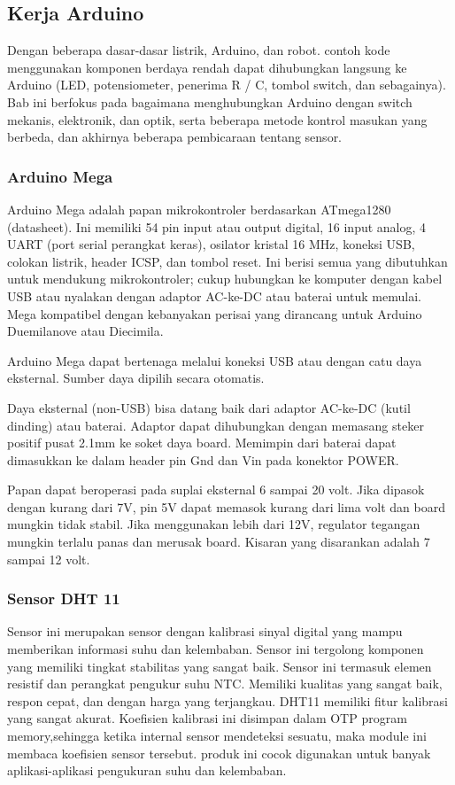 \subsection{Kerja Arduino}
Dengan beberapa dasar-dasar listrik, Arduino, dan robot.
contoh kode menggunakan komponen berdaya rendah dapat dihubungkan langsung ke Arduino (LED, potensiometer, penerima R / C, tombol switch, dan sebagainya). 
Bab ini berfokus pada bagaimana menghubungkan Arduino dengan switch mekanis, elektronik, dan optik, serta beberapa metode kontrol masukan yang berbeda, dan akhirnya beberapa pembicaraan tentang sensor.

\subsubsection{Arduino Mega}

Arduino Mega adalah papan mikrokontroler berdasarkan ATmega1280 (datasheet). Ini memiliki 54 pin input atau output digital, 16 input analog, 4 UART (port serial perangkat keras), osilator kristal 16 MHz, koneksi USB, colokan listrik, header ICSP, dan tombol reset. Ini berisi semua yang dibutuhkan untuk mendukung mikrokontroler; cukup hubungkan ke komputer dengan kabel USB atau nyalakan dengan adaptor AC-ke-DC atau baterai untuk memulai. Mega kompatibel dengan kebanyakan perisai yang dirancang untuk Arduino Duemilanove atau Diecimila.

Arduino Mega dapat bertenaga melalui koneksi USB atau dengan catu daya eksternal. Sumber daya dipilih secara otomatis.

Daya eksternal (non-USB) bisa datang baik dari adaptor AC-ke-DC (kutil dinding) atau baterai. Adaptor dapat dihubungkan dengan memasang steker positif pusat 2.1mm ke soket daya board. Memimpin dari baterai dapat dimasukkan ke dalam header pin Gnd dan Vin pada konektor POWER.

Papan dapat beroperasi pada suplai eksternal 6 sampai 20 volt. Jika dipasok dengan kurang dari 7V, pin 5V dapat memasok kurang dari lima volt dan board mungkin tidak stabil. Jika menggunakan lebih dari 12V, regulator tegangan mungkin terlalu panas dan merusak board. Kisaran yang disarankan adalah 7 sampai 12 volt.
\subsubsection{Sensor DHT 11}
Sensor ini merupakan sensor dengan kalibrasi sinyal digital yang mampu memberikan informasi suhu dan kelembaban. Sensor ini tergolong komponen yang memiliki tingkat stabilitas yang sangat baik. Sensor ini termasuk elemen resistif dan perangkat pengukur suhu NTC.
Memiliki kualitas yang sangat baik, respon cepat, dan dengan harga yang
terjangkau. DHT11 memiliki fitur kalibrasi yang sangat akurat. Koefisien kalibrasi ini disimpan dalam OTP program memory,sehingga ketika internal sensor mendeteksi sesuatu, maka module ini membaca koefisien sensor tersebut. produk ini cocok digunakan untuk banyak aplikasi-aplikasi pengukuran suhu dan kelembaban.

